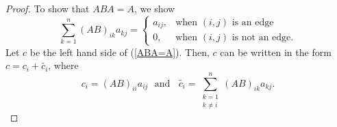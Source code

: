 \documentclass[notitlepage,12pt,reqno]{amsart}
\numberwithin{equation}{section}
\begin{document}
\begin{proof}
To show that $ABA=A$, we show
\begin{equation}\label{ABA=A}
\sum _{k=1}^n(AB)_{ik}a_{kj}=\left\{\begin{array}{ll}
a_{ij}, & \mbox{when }(i, j) \mbox{ is an edge} \\
0, & \mbox{when } (i, j)\mbox{ is not an edge}.
\end{array}\right .
\end{equation}
Let $c$ be the left hand side of (\ref{ABA=A}). Then, $c$ can be written in the form $c=c_i+\tilde{c_i}$, where
$$c_i=(AB)_{ii}a_{ij}\  \  \  \mbox{and}\  \  \  \  \tilde{c_i}=\sum _{\substack {k=1 \\ k\neq i}}^n(AB)_{ik}a_{kj}.$$

\end{proof}
\end{document}
